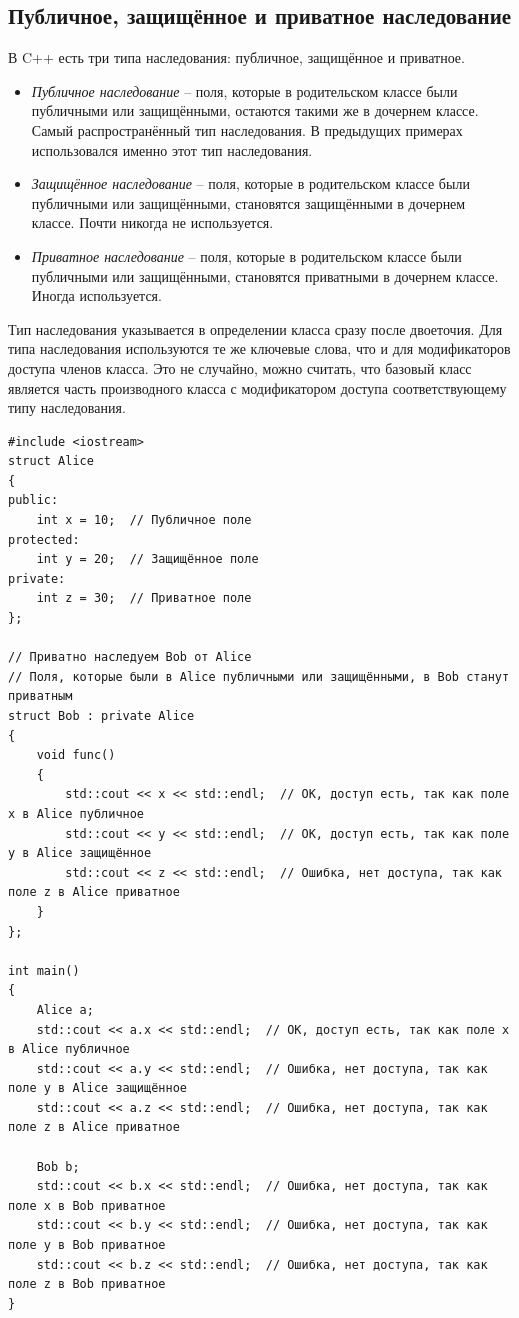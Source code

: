 \documentclass{article}
\begin{document}
\subsection*{Публичное, защищённое и приватное наследование}
В C++ есть три типа наследования: публичное, защищённое и приватное.
\begin{itemize}
\item \textit{Публичное наследование} -- поля, которые в родительском классе были публичными или защищёнными, остаются такими же в дочернем классе. Самый распространённый тип наследования.
В предыдущих примерах использовался именно этот тип наследования.
\item \textit{Защищённое наследование} -- поля, которые в родительском классе были публичными или защищёнными, становятся защищёнными в дочернем классе. Почти никогда не используется.
\item \textit{Приватное наследование} -- поля, которые в родительском классе были публичными или защищёнными, становятся приватными в дочернем классе. Иногда используется.
\end{itemize}
Тип наследования указывается в определении класса сразу после двоеточия. Для типа наследования используются те же ключевые слова, что и для модификаторов доступа членов класса. Это не случайно,  можно считать, что базовый класс является часть производного класса с модификатором доступа соответствующему типу наследования.
\begin{lstlisting}
#include <iostream>
struct Alice
{
public:
	int x = 10;  // Публичное поле
protected:
	int y = 20;  // Защищённое поле
private:
	int z = 30;  // Приватное поле
};

// Приватно наследуем Bob от Alice
// Поля, которые были в Alice публичными или защищёнными, в Bob станут приватным
struct Bob : private Alice  
{
	void func() 
	{
		std::cout << x << std::endl;  // ОК, доступ есть, так как поле x в Alice публичное
		std::cout << y << std::endl;  // ОК, доступ есть, так как поле y в Alice защищённое
		std::cout << z << std::endl;  // Ошибка, нет доступа, так как поле z в Alice приватное
	}  
};

int main()
{
	Alice a;
	std::cout << a.x << std::endl;  // ОК, доступ есть, так как поле x в Alice публичное
	std::cout << a.y << std::endl;  // Ошибка, нет доступа, так как поле y в Alice защищённое
	std::cout << a.z << std::endl;  // Ошибка, нет доступа, так как поле z в Alice приватное
	
	Bob b;
	std::cout << b.x << std::endl;  // Ошибка, нет доступа, так как поле x в Bob приватное
	std::cout << b.y << std::endl;  // Ошибка, нет доступа, так как поле y в Bob приватное
	std::cout << b.z << std::endl;  // Ошибка, нет доступа, так как поле z в Bob приватное
}
\end{lstlisting}
\end{document}
